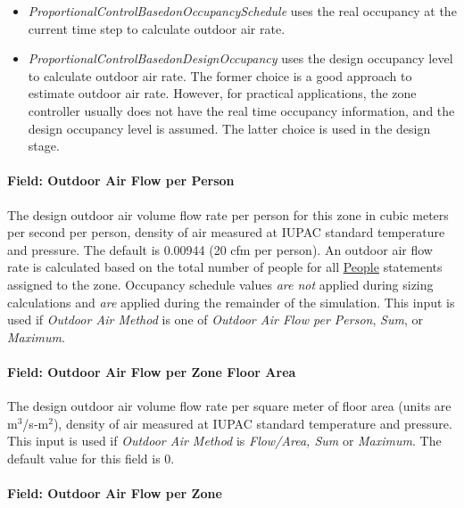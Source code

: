\begin{itemize}
\item  \emph{ProportionalControlBasedonOccupancySchedule} uses the real occupancy at the current time step to calculate outdoor air rate.

\item  \emph{ProportionalControlBasedonDesignOccupancy} uses the design occupancy level to calculate outdoor air rate. The former choice is a good approach to estimate outdoor air rate. However, for practical applications, the zone controller usually does not have the real time occupancy information, and the design occupancy level is assumed. The latter choice is used in the design stage.

\end{itemize}


\paragraph{Field: Outdoor Air Flow per Person}\label{field-outdoor-air-flow-per-person}

The design outdoor air volume flow rate per person for this zone in cubic meters per second per person, density of air measured at IUPAC standard temperature and pressure. The default is 0.00944 (20 cfm per person). An outdoor air flow rate is calculated based on the total number of people for all \hyperref[people]{People} statements assigned to the zone. Occupancy schedule values \emph{are not} applied during sizing calculations and \emph{are} applied during the remainder of the simulation. This input is used if \emph{Outdoor Air Method} is one of \emph{Outdoor Air Flow per Person}, \emph{Sum}, or \emph{Maximum}.

\paragraph{Field: Outdoor Air Flow per Zone Floor Area}\label{field-outdoor-air-flow-per-zone-floor-area}

The design outdoor air volume flow rate per square meter of floor area (units are m\(^{3}\)/s-m\(^{2}\)), density of air measured at IUPAC standard temperature and pressure. This input is used if \emph{Outdoor Air Method} is \emph{Flow/Area, Sum} or \emph{Maximum}. The default value for this field is 0.

\paragraph{Field: Outdoor Air Flow per Zone}\label{field-outdoor-air-flow-per-zone}

